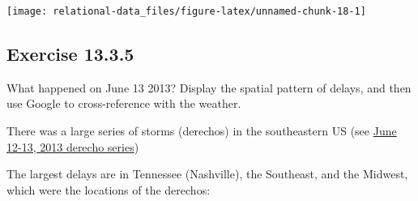 \documentclass[]{book}
\newenvironment{Shaded}{\begin{snugshade}}{\end{snugshade}}
\newcommand{\DataTypeTok}[1]{\textcolor[rgb]{0.13,0.29,0.53}{#1}}
\newcommand{\KeywordTok}[1]{\textcolor[rgb]{0.13,0.29,0.53}{\textbf{#1}}}
\newcommand{\NormalTok}[1]{#1}
\newcommand{\OperatorTok}[1]{\textcolor[rgb]{0.81,0.36,0.00}{\textbf{#1}}}
\newcommand{\OtherTok}[1]{\textcolor[rgb]{0.56,0.35,0.01}{#1}}
\newcommand{\StringTok}[1]{\textcolor[rgb]{0.31,0.60,0.02}{#1}}
\theoremstyle{plain}
\theoremstyle{remark}
\begin{document}
\begin{Shaded}
\end{Shaded}

\begin{center}\texttt{[image: relational-data\_files/figure-latex/unnamed-chunk-18-1]} \end{center}

\hypertarget{exercise-13.3.5}{%
\subsection*{\texorpdfstring{Exercise
{13.3.5}}{Exercise 13.3.5}}\label{exercise-13.3.5}}

What happened on June 13 2013? Display the spatial pattern of delays,
and then use Google to cross-reference with the weather.

There was a large series of storms (derechos) in the southeastern US
(see
\href{https://en.wikipedia.org/wiki/June_12\%E2\%80\%9313,_2013_derecho_series}{June
12-13, 2013 derecho series})

The largest delays are in Tennessee (Nashville), the Southeast, and the
Midwest, which were the locations of the derechos:
\end{document}
